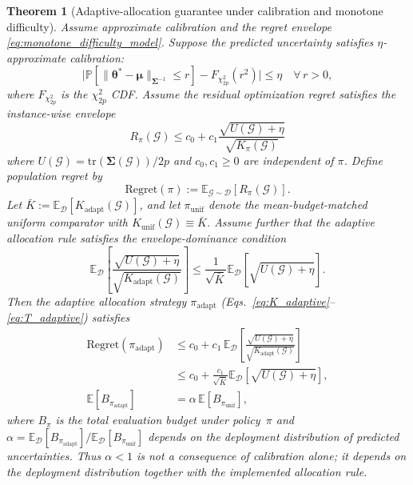 \documentclass[aps,prx,reprint,superscriptaddress,longbibliography]{revtex4-2}
\newcommand{\calG}{\mathcal{G}}
\newcommand{\calD}{\mathcal{D}}
\newcommand{\bbE}{\mathbb{E}}
\newcommand{\bbP}{\mathbb{P}}
\newtheorem{theorem}{Theorem}
\begin{document}
\begin{theorem}[Adaptive-allocation guarantee under calibration and monotone difficulty]
\label{thm:regret}
Assume approximate calibration and the regret envelope
\cref{eq:monotone_difficulty_model}. Suppose the predicted uncertainty
satisfies
$\eta$-approximate calibration:
\begin{equation}
    \bigl|\bbP[\|\bm\theta^* - \bm\mu\|_{\bm\Sigma^{-1}} \le r]
    - F_{\chi^2_{2p}}(r^2)\bigr| \le \eta
    \quad \forall\, r > 0,
    \label{eq:eta_cal}
\end{equation}
where $F_{\chi^2_{2p}}$ is the $\chi^2_{2p}$ CDF\@.
Assume the residual optimization regret satisfies the instance-wise
envelope
\begin{equation}
    R_\pi(\calG) \le c_0 + c_1\frac{\sqrt{U(\calG)+\eta}}
    {\sqrt{K_\pi(\calG)}}
    \label{eq:monotone_difficulty_model}
\end{equation}
where $U(\calG)=\mathrm{tr}(\bm\Sigma(\calG))/2p$ and
$c_0,c_1 \ge 0$ are independent of $\pi$. Define population regret by
\begin{equation}
    \mathrm{Regret}(\pi) := \bbE_{\calG\sim\calD}[R_\pi(\calG)].
    \label{eq:policy_regret_def}
\end{equation}
Let $\bar K := \bbE_\calD[K_{\mathrm{adapt}}(\calG)]$, and let
$\pi_{\mathrm{unif}}$ denote the mean-budget-matched uniform comparator
with $K_{\mathrm{unif}}(\calG) \equiv \bar K$.
Assume further that the adaptive allocation rule satisfies the
envelope-dominance condition
\begin{equation}
    \bbE_\calD\!\left[
    \frac{\sqrt{U(\calG)+\eta}}{\sqrt{K_{\mathrm{adapt}}(\calG)}}
    \right]
    \le \frac{1}{\sqrt{\bar K}}
    \bbE_\calD\!\left[\sqrt{U(\calG)+\eta}\right].
    \label{eq:allocation_dominance}
\end{equation}
Then the adaptive allocation strategy $\pi_{\mathrm{adapt}}$
(Eqs.~\ref{eq:K_adaptive}--\ref{eq:T_adaptive}) satisfies
\begin{align}
    \mathrm{Regret}(\pi_{\mathrm{adapt}})
    &\le c_0 + c_1\,\bbE_\calD\!\left[
    \frac{\sqrt{U(\calG)+\eta}}{\sqrt{K_{\mathrm{adapt}}(\calG)}}
    \right] \nonumber \\
    &\le c_0 + \frac{c_1}{\sqrt{\bar K}}
    \bbE_\calD\!\left[\sqrt{U(\calG)+\eta}\right],
    \label{eq:regret} \\
    \bbE[B_{\pi_{\mathrm{adapt}}}]
    &= \alpha\,\bbE[B_{\pi_{\mathrm{unif}}}],
    \label{eq:budget_savings}
\end{align}
where $B_\pi$ is the total evaluation budget under policy~$\pi$ and
$\alpha = \bbE_\calD[B_{\pi_{\mathrm{adapt}}}] /
\bbE_\calD[B_{\pi_{\mathrm{unif}}}]$ depends on the deployment
distribution of predicted uncertainties. Thus $\alpha<1$ is not a
consequence of calibration alone; it depends on the deployment
distribution together with the implemented allocation rule.
\end{theorem}
\end{document}
